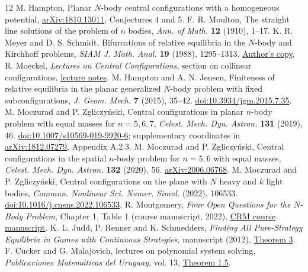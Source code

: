 \documentclass[11pt]{article}
\begin{document}
\small
\begin{thebibliography}{12}
 M. Hampton, Planar $N$-body central configurations with a homogeneous potential, \href{https://arxiv.org/abs/1810.13011}{arXiv:1810.13011}, Conjectures 4 and 5.
 F. R. Moulton, The straight line solutions of the problem of $n$ bodies, \emph{Ann. of Math.} \textbf{12} (1910), 1--17.
 K. R. Meyer and D. S. Schmidt, Bifurcations of relative equilibria in the $N$-body and Kirchhoff problems, \emph{SIAM J. Math. Anal.} \textbf{19} (1988), 1295--1313. \href{https://homepages.uc.edu/~schmiddr/My_Papers/DSS-20.pdf}{Author's copy}.
 R. Moeckel, \emph{Lectures on Central Configurations}, section on collinear configurations, \href{https://www-users.cse.umn.edu/~rmoeckel/notes/CentralConfigurations.pdf}{lecture notes}.
 M. Hampton and A. N. Jensen, Finiteness of relative equilibria in the planar generalized $N$-body problem with fixed subconfigurations, \emph{J. Geom. Mech.} \textbf{7} (2015), 35--42. \href{https://doi.org/10.3934/jgm.2015.7.35}{doi:10.3934/jgm.2015.7.35}.
 M. Moczurad and P. Zgliczyński, Central configurations in planar $n$-body problem with equal masses for $n=5,6,7$, \emph{Celest. Mech. Dyn. Astron.} \textbf{131} (2019), 46. \href{https://doi.org/10.1007/s10569-019-9920-6}{doi:10.1007/s10569-019-9920-6}; supplementary coordinates in \href{https://arxiv.org/pdf/1812.07279}{arXiv:1812.07279}, Appendix A.2.3.
 M. Moczurad and P. Zgliczyński, Central configurations in the spatial $n$-body problem for $n=5,6$ with equal masses, \emph{Celest. Mech. Dyn. Astron.} \textbf{132} (2020), 56. \href{https://arxiv.org/abs/2006.06768}{arXiv:2006.06768}.
 M. Moczurad and P. Zgliczyński, Central configurations on the plane with $N$ heavy and $k$ light bodies, \emph{Commun. Nonlinear Sci. Numer. Simul.} (2022), 106533. \href{https://doi.org/10.1016/j.cnsns.2022.106533}{doi:10.1016/j.cnsns.2022.106533}.
 R. Montgomery, \emph{Four Open Questions for the $N$-Body Problem}, Chapter 1, Table 1 (course manuscript, 2022). \href{https://www.crm.cat/wp-content/uploads/2022/06/bookQ-copy.pdf}{CRM course manuscript}.
 K. L. Judd, P. Renner and K. Schmedders, \emph{Finding All Pure-Strategy Equilibria in Games with Continuous Strategies}, manuscript (2012), \href{https://ice.uchicago.edu/2012_presentations/Faculty/Schmedders/AllEquilibriaFinal_paper.pdf}{Theorem 3}.
 F. Cucker and G. Malajovich, lectures on polynomial system solving, \emph{Publicaciones Matem\'aticas del Uruguay}, vol. 13, \href{https://pmu.uy/pmu13/pmu13.pdf}{Theorem 1.5}.

\end{thebibliography}
\end{document}
